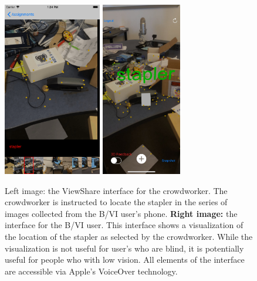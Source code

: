 \documentclass[chi_draft]{sigchi}
\newcommand{\BVI}{B/VI\xspace}
\begin{document}
\begin{figure}
\begin{center}
\includegraphics[height=3in]{Figures/viewshare_crowdworker}
\includegraphics[height=3in]{Figures/viewshare_user}
\end{center}
\caption{Left image: the ViewShare interface for the crowdworker.  The crowdworker is instructed to locate the stapler in the series of images collected from the \BVI user's phone.  \textbf{Right image:} the interface for the \BVI user.  This interface shows a visualization of the location of the stapler as selected by the crowdworker.  While the visualization is not useful for user's who are blind, it is potentially useful for people who with low vision.  All elements of the interface are accessible via Apple's VoiceOver technology.\label{fig:viewsharescreenshots}}
\end{figure}
\end{document}
